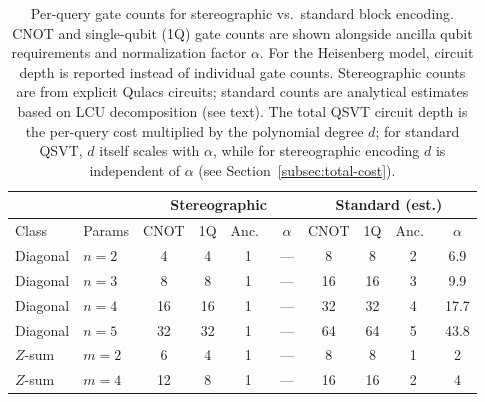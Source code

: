 \begin{table}
	\caption{Per-query gate counts for stereographic vs.\ standard
		block encoding.
		CNOT and single-qubit (1Q) gate counts are shown
		alongside ancilla qubit requirements and normalization
		factor $\alpha$.  For the Heisenberg model, circuit
		depth is reported instead of individual gate counts.
		Stereographic counts are from explicit Qulacs circuits;
		standard counts are analytical estimates based on LCU
		decomposition (see text).  The total QSVT circuit depth
		is the per-query cost multiplied by the polynomial
		degree $d$; for standard QSVT, $d$ itself scales with
		$\alpha$, while for stereographic encoding $d$ is
		independent of $\alpha$
		(see Section~\ref{subsec:total-cost}).}
	\label{tab:gate-counts}
	\begin{ruledtabular}
		\begin{tabular}{llcccccccc}
			           &                 & \multicolumn{4}{c}{Stereographic} & \multicolumn{4}{c}{Standard (est.)}                                                                           \\
			\hline
			Class      & Params          & CNOT                              & 1Q                                  & Anc.\  & $\alpha$                      & CNOT & 1Q  & Anc.\  & $\alpha$ \\
			\hline
			Diagonal   & $n=2$           & 4                                 & 4                                   & 1      & ---                           & 8    & 8   & 2      & 6.9      \\
			Diagonal   & $n=3$           & 8                                 & 8                                   & 1      & ---                           & 16   & 16  & 3      & 9.9      \\
			Diagonal   & $n=4$           & 16                                & 16                                  & 1      & ---                           & 32   & 32  & 4      & 17.7     \\
			Diagonal   & $n=5$           & 32                                & 32                                  & 1      & ---                           & 64   & 64  & 5      & 43.8     \\
			$Z$-sum    & $m=2$           & 6                                 & 4                                   & 1      & ---                           & 8    & 8   & 1      & 2        \\
			$Z$-sum    & $m=4$           & 12                                & 8                                   & 1      & ---                           & 16   & 16  & 2      & 4        \\

\end{tabular}
\end{ruledtabular}
\end{table}
